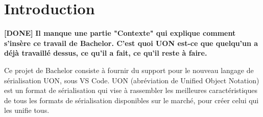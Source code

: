 \documentclass[
    iict, %
    il, %
]{heig-tb}
\begin{document}
\maketitle
\frontmatter
\clearemptydoublepage

\preamble
\let\cleardoublepage\clearpage
\authentification
\let\cleardoublepage\clearpage

\begin{abstract}
    
\end{abstract}

\listoffigures
{}
\listoflistings
{}

\tableofcontents

\printnomenclature
\clearemptydoublepage
{}

\pagestyle{fancy}
\fancyhf{}
\renewcommand\headrulewidth{1pt}

\fancyhead[L]{\itshape\nouppercase{\leftmark}}

\renewcommand{\chaptermark}[1]{\markboth{\MakeUppercase{#1}}{}}

\renewcommand\footrulewidth{1pt}


\renewcommand{\headrulewidth}{0.4pt}
\renewcommand{\footrulewidth}{0.4pt}

\titlespacing*{\chapter}{0pt}{-40pt}{20pt}


\mainmatter
\chapter{Introduction}

\textbf{[DONE]}
\textbf{Il manque une partie "Contexte" qui explique comment s'insère ce travail de Bachelor. C'est quoi UON est-ce que quelqu'un a déjà travaillé dessus, ce qu'il a fait, ce qu'il reste à faire.}

Ce projet de Bachelor consiste à fournir du support pour le nouveau langage de sérialisation UON, sous VS Code.
UON (abréviation de Unified Object Notation) est un format de sérialisation qui vise à rassembler les meilleures caractéristiques de tous les formats de sérialisation disponibles sur le marché, pour créer celui qui les unifie tous.
\end{document}
